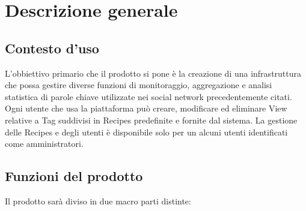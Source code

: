 %


\section{Descrizione generale}

\subsection{Contesto d'uso}
L'obbiettivo primario che il prodotto si pone è la creazione di una infrastruttura che
possa gestire diverse funzioni di monitoraggio, aggregazione e analisi statistica di parole chiave utilizzate nei social network precedentemente citati. Ogni utente che usa la piattaforma può creare, modificare ed eliminare View relative a Tag suddivisi in Recipes predefinite e fornite dal sistema.
La gestione delle Recipes e degli utenti è disponibile solo per un alcuni utenti identificati come amministratori.

\subsection{Funzioni del prodotto}
Il prodotto sarà diviso in due macro parti distinte:

